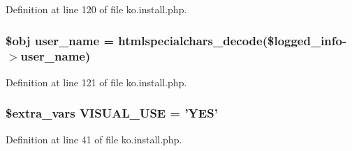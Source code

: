 Definition at line 120 of file ko.\+install.\+php.

\hypertarget{ko_8install_8php_a115401aff7da80e73c66e9f76505426b}{
\subsubsection[{user\+\_\+name}]{\setlength{\rightskip}{0pt plus 5cm}\$obj user\+\_\+name = htmlspecialchars\+\_\+decode(\$logged\+\_\+info-\/$>$user\+\_\+name)}}\label{ko_8install_8php_a115401aff7da80e73c66e9f76505426b}


Definition at line 121 of file ko.\+install.\+php.

\hypertarget{ko_8install_8php_a7d7de44c97265901bad00952f899d833}{
\subsubsection[{V\+I\+S\+U\+A\+L\+\_\+\+U\+S\+E}]{\setlength{\rightskip}{0pt plus 5cm}\${\bf extra\+\_\+vars} V\+I\+S\+U\+A\+L\+\_\+\+U\+S\+E = 'Y\+E\+S'}}\label{ko_8install_8php_a7d7de44c97265901bad00952f899d833}


Definition at line 41 of file ko.\+install.\+php.

